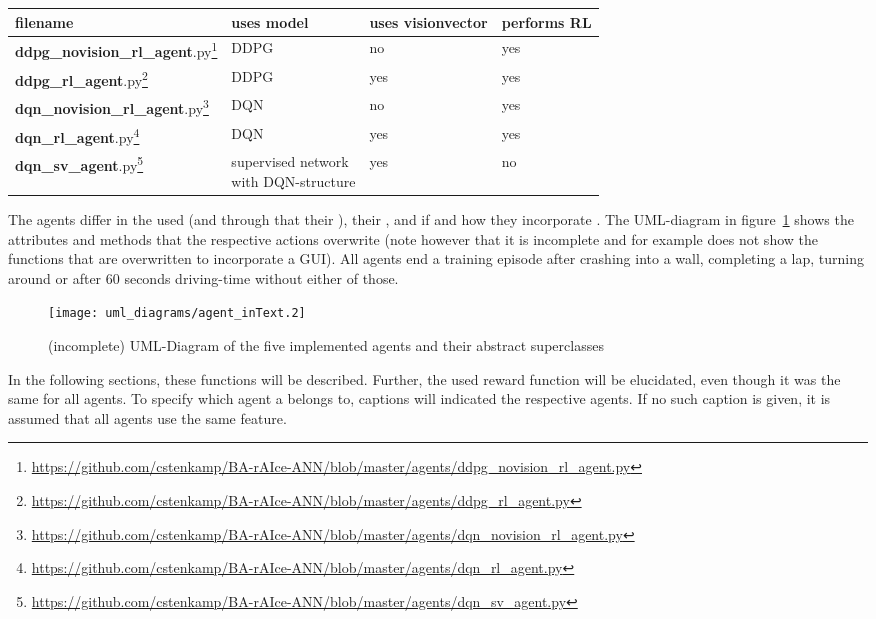 \begin{flushleft}
\begin{tabular}{l l l l}
	filename & uses model & uses visionvector & performs RL\\
	\hline
	\textbf{ddpg\_novision\_rl\_agent}.py\footnote{\url{https://github.com/cstenkamp/BA-rAIce-ANN/blob/master/agents/ddpg_novision_rl_agent.py}} & DDPG & no & yes\\	
	\textbf{ddpg\_rl\_agent}.py\footnote{\url{https://github.com/cstenkamp/BA-rAIce-ANN/blob/master/agents/ddpg_rl_agent.py}} & DDPG & yes & yes\\
	\textbf{dqn\_novision\_rl\_agent}.py\footnote{\url{https://github.com/cstenkamp/BA-rAIce-ANN/blob/master/agents/dqn_novision_rl_agent.py}} & DQN & no & yes\\
	\textbf{dqn\_rl\_agent}.py\footnote{\url{https://github.com/cstenkamp/BA-rAIce-ANN/blob/master/agents/dqn_rl_agent.py}} & DQN & yes & yes\\
	\textbf{dqn\_sv\_agent}.py\footnote{\url{https://github.com/cstenkamp/BA-rAIce-ANN/blob/master/agents/dqn_sv_agent.py}} & \blap{supervised network\\ with DQN-structure} & yes & no\\[2em]
\end{tabular}
\end{flushleft}

The agents differ in the used  (and through that their ), their , and if and how they incorporate . The UML-diagram in figure~\ref{fig:umlAgents} shows the attributes and methods that the respective actions overwrite (note however that it is incomplete and for example does not show the functions that are overwritten to incorporate a GUI). All agents end a training episode after crashing into a wall, completing a lap, turning around or after $60$ seconds driving-time without either of those.

\begin{figure}[h]
	\centering 
	\texttt{[image: uml\_diagrams/agent\_inText.2]}  
	\caption[UML-Diagram of the implemented agents and their superclasses]{(incomplete) UML-Diagram of the five implemented agents and their abstract superclasses}
	\label{fig:umlAgents}
\end{figure}

In the following sections, these functions will be described. Further, the used reward function will be elucidated, even though it was the same for all agents. To specify which agent a  belongs to, captions will indicated the respective agents. If no such caption is given, it is assumed that all agents use the same feature.

